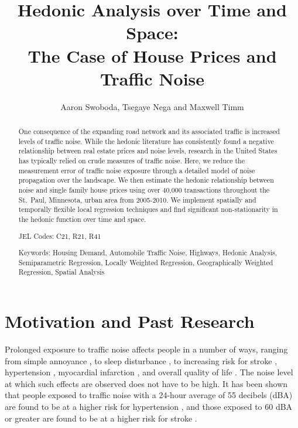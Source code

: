 \documentclass{article}\usepackage[]{graphicx}\usepackage[]{color}
\title{Hedonic Analysis over Time and Space:\\ The Case of House Prices and Traffic Noise}
\date{}
\author{Aaron Swoboda, Tsegaye Nega and Maxwell Timm}
\begin{document}
\maketitle
{}
\begin{singlespace}
\begin{abstract}
One consequence of the expanding road network and its associated traffic is increased levels of traffic noise.  While the hedonic literature has consistently found a negative relationship between real estate prices and noise levels, research in the United States has typically relied on crude measures of traffic noise. Here, we reduce the measurement error of traffic noise exposure through a detailed model of noise propagation over the landscape. We then estimate the hedonic relationship between noise and single family house prices using over 40,000 transactions throughout the St.\ Paul, Minnesota, urban area from 2005-2010. We implement spatially and temporally flexible local regression techniques and find significant non-stationarity in the hedonic function over time and space.

\vspace{.3in}
\noindent
JEL Codes: C21, R21, R41

\vspace{.15in}
\noindent
Keywords: Housing Demand, Automobile Traffic Noise, Highways, Hedonic Analysis, Semiparametric Regression, Locally Weighted Regression, Geographically Weighted Regression, Spatial Analysis
\end{abstract}
\end{singlespace}

\clearpage
{} 

\section{Motivation and Past Research}\label{sec:lit}
Prolonged exposure to traffic noise affects people in a number of ways, ranging from simple annoyance \citep{Miedema2001, Ouis2001, Ohrstrom2007, DeKluizenaar2013, Weinhold2013}, to sleep disturbance , to increasing risk for stroke \citep{Sorensen2011}, hypertension \citep{Jarup2008, Bodin2009}, myocardial infarction \citep{Babisch2005}, and overall quality of life \citep{Shepherd2013}. The noise level at which such effects are observed does not have to be high.  It has been shown that people exposed to traffic noise with a 24-hour average of 55 decibels (dBA) are found to be at a higher risk for hypertension \citep{Barregard2009, Bodin2009}, and those exposed to 60 dBA or greater are found to be at a higher risk for stroke \citep{Sorensen2011}.  
\end{document}
